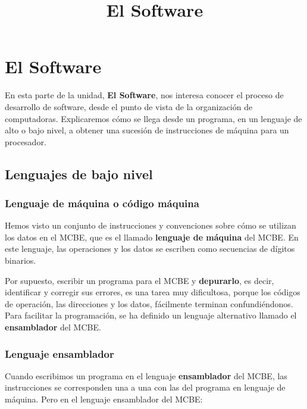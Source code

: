 \documentclass[spanish,A4,]{article}
\title{El Software}
\begin{document}
\maketitle

\section{El Software}\label{el-software}

En esta parte de la unidad, \textbf{El Software}, nos interesa conocer
el proceso de desarrollo de software, desde el punto de vista de la
organización de computadoras. Explicaremos cómo se llega desde un
programa, en un lenguaje de alto o bajo nivel, a obtener una sucesión de
instrucciones de máquina para un procesador.

\subsection{Lenguajes de bajo nivel}\label{lenguajes-de-bajo-nivel}

\subsubsection{Lenguaje de máquina o código
máquina}\label{lenguaje-de-muxe1quina-o-cuxf3digo-muxe1quina}

Hemos visto un conjunto de instrucciones y convenciones sobre cómo se
utilizan los datos en el MCBE, que es el llamado \textbf{lenguaje de
máquina} del MCBE. En este lenguaje, las operaciones y los datos se
escriben como secuencias de dígitos binarios.

Por supuesto, escribir un programa para el MCBE y \textbf{depurarlo}, es
decir, identificar y corregir sus errores, es una tarea muy dificultosa,
porque los códigos de operación, las direcciones y los datos, fácilmente
terminan confundiéndonos. Para facilitar la programación, se ha definido
un lenguaje alternativo llamado el \textbf{ensamblador} del MCBE.

\subsubsection{Lenguaje ensamblador}\label{lenguaje-ensamblador}

Cuando escribimos un programa en el lenguaje \textbf{ensamblador} del
MCBE, las instrucciones se corresponden una a una con las del programa
en lenguaje de máquina. Pero en el lenguaje ensamblador del MCBE:
\end{document}

